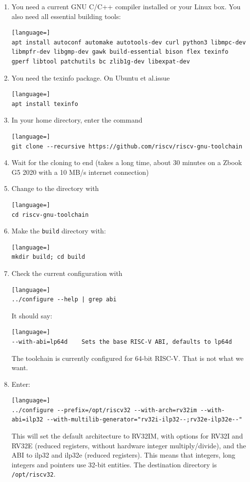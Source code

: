\documentclass[12pt]{article}
\begin{document}
\begin{enumerate}
\item You need a current GNU C/C++ compiler installed or your Linux box. You also need all essential building tools:
\begin{lstlisting}[language=]
apt install autoconf automake autotools-dev curl python3 libmpc-dev libmpfr-dev libgmp-dev gawk build-essential bison flex texinfo gperf libtool patchutils bc zlib1g-dev libexpat-dev
\end{lstlisting}
\item You need the texinfo package. On Ubuntu et al.\@ issue
\begin{lstlisting}[language=]
apt install texinfo
\end{lstlisting}
\item In your home directory, enter the command
\begin{lstlisting}[language=]
git clone --recursive https://github.com/riscv/riscv-gnu-toolchain
\end{lstlisting}
\item Wait for the cloning to end (takes a long time, about 30 minutes on a Zbook G5 2020 with a 10 MB/s internet connection)
\item Change to the directory with
\begin{lstlisting}[language=]
cd riscv-gnu-toolchain
\end{lstlisting}
\item Make the \lstinline|build| directory with:
\begin{lstlisting}[language=]
mkdir build; cd build
\end{lstlisting}
\item Check the current configuration with
\begin{lstlisting}[language=]
../configure --help | grep abi
\end{lstlisting}
      It should say:
\begin{lstlisting}[language=]
--with-abi=lp64d    Sets the base RISC-V ABI, defaults to lp64d
\end{lstlisting}
The toolchain is currently configured for 64-bit RISC-V. That is not what we want.
\item Enter:
\begin{lstlisting}[language=]
../configure --prefix=/opt/riscv32 --with-arch=rv32im --with-abi=ilp32 --with-multilib-generator="rv32i-ilp32--;rv32e-ilp32e--"
\end{lstlisting}
This will set the default architecture to RV32IM, with options for RV32I and RV32E (reduced registers, without hardware integer multiply/divide), and the ABI to ilp32 and ilp32e (reduced registers). This means that integers, long integers and pointers use 32-bit entities. The destination directory is \lstinline|/opt/riscv32|.


\end{enumerate}
\end{document}
